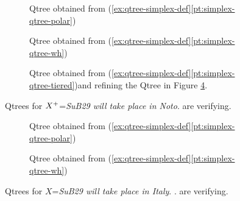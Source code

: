 \begin{figure}[H]
	\centering
	\begin{subfigure}[b]{.18\linewidth}
		\centering
		\caption{Qtree obtained from (\ref{ex:qtree-simplex-def}\ref{pt:simplex-qtree-polar})}
	\end{subfigure}\hfill
	\begin{subfigure}[b]{.35\linewidth}
		\centering
		\caption{Qtree obtained from (\ref{ex:qtree-simplex-def}\ref{pt:simplex-qtree-wh})}
	\end{subfigure}\hfill
	\begin{subfigure}[b]{.35\linewidth}
		\centering
		\caption{Qtree obtained from (\ref{ex:qtree-simplex-def}\ref{pt:simplex-qtree-tiered})\footnotemark and refining the Qtree in Figure \ref{fig:qtree-italy-wh}.}\label{fig:qtree-noto-2-tiered}
	\end{subfigure}
	\caption{Qtrees for $X\protect^+$=\textit{SuB29 will take place in Noto}.  are verifying.}
	\label{fig:qtrees-noto}
\end{figure}

\begin{figure}[H]
	\centering
	\begin{subfigure}[b]{.45\linewidth}
		\centering
		\caption{Qtree obtained from (\ref{ex:qtree-simplex-def}\ref{pt:simplex-qtree-polar})}\label{fig:qtree-italy-polar}
	\end{subfigure}\hfill
	\begin{subfigure}[b]{.45\linewidth}
		\centering
		\caption{Qtree obtained from (\ref{ex:qtree-simplex-def}\ref{pt:simplex-qtree-wh})}\label{fig:qtree-italy-wh}
	\end{subfigure}
	\caption{Qtrees for $X$=\textit{SuB29 will take place in Italy}. .  are verifying.}
	\label{fig:qtrees-italy}
\end{figure}


